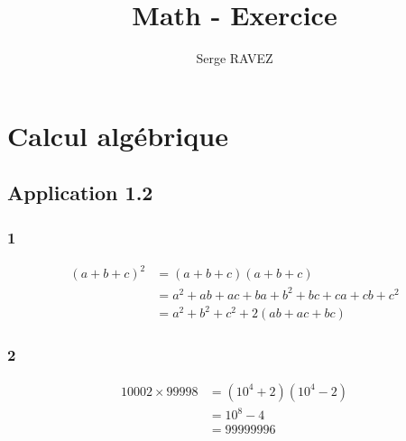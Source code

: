 \documentclass[12pt]{smfbook}
\title{Math - Exercice}
\author{Serge RAVEZ}
\begin{document}
\maketitle





\chapter{Calcul algébrique}

\section*{Application 1.2}

\subsection*{1}
\begin{equation*}
\begin{split}
	(a+b+c)^{2} &= (a+b+c)(a+b+c) \\
	&= a^{2}+ab+ac+ba+b^{2}+bc+ca+cb+c^{2}\\
	&=a^{2}+b^{2}+c^{2} + 2(ab+ac+bc)
\end{split}	
\end{equation*}


\subsection*{2}

\begin{equation*}
	\begin{split}
		10002 \times 99998 &= (10^4 +2)(10^4 - 2) \\
		                                   &= 10^8 - 4 \\
		                                   &= 99 999 996
	\end{split}
\end{equation*}
\end{document}
